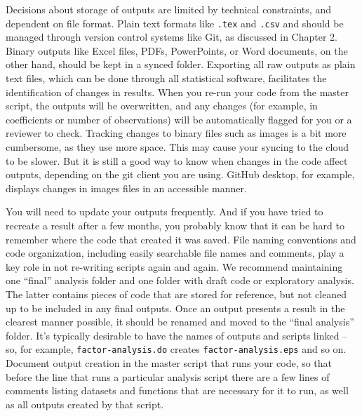 Decisions about storage of outputs are limited by technical constraints, 
and dependent on file format.
Plain text formats like \texttt{.tex} and \texttt{.csv} 
and should be managed through version control systems like Git, as discussed in Chapter 2.
Binary outputs like Excel files, PDFs, PowerPoints, or Word documents, 
on the other hand, should be kept in a synced folder.
Exporting all raw outputs as plain text files, which can be done through all statistical software,
facilitates the identification of changes in results.
When you re-run your code from the master script,
the outputs will be overwritten,
and any changes (for example, in coefficients or number of observations)
will be automatically flagged for you or a reviewer to check.
Tracking changes to binary files such as images is a bit more cumbersome, as they use more space.
This may cause your syncing to the cloud to be slower.
But it is still a good way to know when changes in the code affect outputs,
depending on the git client you are using.
GitHub desktop, for example, displays changes in images files in an accessible manner.

You will need to update your outputs frequently.
And if you have tried to recreate a result after a few months,
you probably know that it can be hard to remember where the code that created it was saved.
File naming conventions and code organization,
including easily searchable file names and comments,
play a key role in not re-writing scripts again and again.
We recommend maintaining one ``final'' analysis folder
and one folder with draft code or exploratory analysis.
The latter contains pieces of code that are stored for reference,
but not cleaned up to be included in any final outputs.
Once an output presents a result in the clearest manner possible,
it should be renamed and moved to the ``final analysis'' folder.
It's typically desirable to have the names of outputs and scripts linked --
so, for example, \texttt{factor-analysis.do} creates \texttt{factor-analysis.eps} and so on.
Document output creation in the master script that runs your code,
so that before the line that runs a particular analysis script
there are a few lines of comments listing
datasets and functions that are necessary for it to run,
as well as all outputs created by that script.


